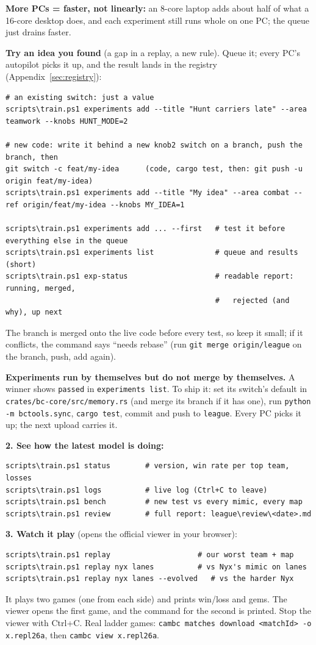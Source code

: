\documentclass[11pt,a4paper]{article}
\newcommand{\f}[1]{\texttt{#1}}
\begin{document}
\textbf{More PCs = faster, not linearly:} an 8-core laptop adds about half of what a 16-core desktop
does, and each experiment still runs whole on one PC; the queue just drains faster.

\textbf{Try an idea you found} (a gap in a replay, a new rule). Queue it; every PC's autopilot picks
it up, and the result lands in the registry (Appendix~\ref{sec:registry}):
\begin{lstlisting}
# an existing switch: just a value
scripts\train.ps1 experiments add --title "Hunt carriers late" --area teamwork --knobs HUNT_MODE=2

# new code: write it behind a new knob2 switch on a branch, push the branch, then
git switch -c feat/my-idea      (code, cargo test, then: git push -u origin feat/my-idea)
scripts\train.ps1 experiments add --title "My idea" --area combat --ref origin/feat/my-idea --knobs MY_IDEA=1

scripts\train.ps1 experiments add ... --first   # test it before everything else in the queue
scripts\train.ps1 experiments list              # queue and results (short)
scripts\train.ps1 exp-status                    # readable report: running, merged,
                                                #   rejected (and why), up next
\end{lstlisting}
The branch is merged onto the live code before every test, so keep it small; if it conflicts, the
command says ``needs rebase'' (run \f{git merge origin/league} on the branch, push, add again).

\textbf{Experiments run by themselves but do not merge by themselves.} A winner shows
\f{passed} in \f{experiments list}. To ship it: set its switch's default in
\f{crates/bc-core/src/memory.rs} (and merge its branch if it has one), run \f{python -m bctools.sync},
\f{cargo test}, commit and push to \f{league}. Every PC picks it up; the next upload carries it.

\textbf{2. See how the latest model is doing:}
\begin{lstlisting}
scripts\train.ps1 status        # version, win rate per top team, losses
scripts\train.ps1 logs          # live log (Ctrl+C to leave)
scripts\train.ps1 bench         # new test vs every mimic, every map
scripts\train.ps1 review        # full report: league\review\<date>.md
\end{lstlisting}

\textbf{3. Watch it play} (opens the official viewer in your browser):
\begin{lstlisting}
scripts\train.ps1 replay                    # our worst team + map
scripts\train.ps1 replay nyx lanes          # vs Nyx's mimic on lanes
scripts\train.ps1 replay nyx lanes --evolved   # vs the harder Nyx
\end{lstlisting}
It plays two games (one from each side) and prints win/loss and gems. The viewer opens the first game, and the
command for the second is printed. Stop the viewer with Ctrl+C. Real ladder games:
\f{cambc matches download <matchId> -o x.repl26a}, then \f{cambc view x.repl26a}.
\end{document}
